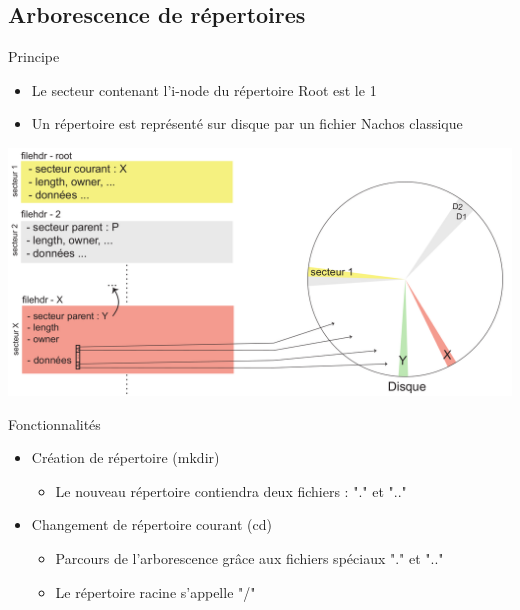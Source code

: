 \documentclass{beamer}
\begin{document}
\subsection{Arborescence de répertoires}
\begin{frame}
  \begin{block}{Principe}
  	\begin{itemize}%
  		\item Le secteur contenant l'i-node du répertoire Root est le 1
  		\item Un répertoire est représenté sur disque par un fichier Nachos classique
  	\end{itemize}  
  \end{block}
  \begin{center}
	  \includegraphics[scale=0.2]{images/FS1.png}
  \end{center}
\end{frame}

\begin{frame}
  \begin{block}{Fonctionnalités}
  	\begin{itemize}[<+->]
  		\item Création de répertoire (mkdir)
  		\begin{itemize}
  			\item Le nouveau répertoire contiendra deux fichiers : "." et ".."
  		\end{itemize}
  		\item Changement de répertoire courant (cd)
  		\begin{itemize}
  			\item Parcours de l'arborescence grâce aux fichiers spéciaux "." et ".."
  			\item Le répertoire racine s'appelle "/"
  		\end{itemize}
  	\end{itemize}
  \end{block}
\end{frame}
\end{document}
